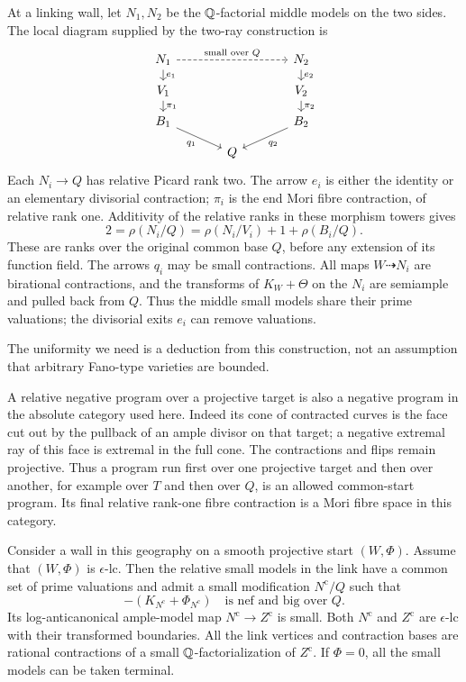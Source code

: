 At a linking wall, let $N_1,N_2$ be the $\mathbb Q$-factorial middle models
on the two sides. The local diagram supplied by the two-ray construction is
\[
\begin{tikzcd}[row sep=small,column sep=large]
 N_1 \arrow[rr,dashed,"\text{small over }Q"] \arrow[d,"e_1"]
   && N_2 \arrow[d,"e_2"] \\
 V_1 \arrow[d,"\pi_1"] && V_2 \arrow[d,"\pi_2"] \\
 B_1 \arrow[dr,"q_1"'] && B_2 \arrow[dl,"q_2"] \\
 & Q &
\end{tikzcd}
\]
Each $N_i\to Q$ has relative Picard rank two. The arrow $e_i$ is
either the identity or an elementary divisorial contraction;
$\pi_i$ is the end Mori fibre contraction, of relative rank one.
Additivity of the relative ranks in these morphism towers gives
\begin{equation}\label{bd:rank-tower}
 2=\rho(N_i/Q)=\rho(N_i/V_i)+1+\rho(B_i/Q).
\end{equation}
These are ranks over the original common base $Q$, before any
extension of its function field. The arrows $q_i$ may be small
contractions. All maps $W\dashrightarrow N_i$ are birational
contractions, and the transforms of $K_W+\Theta$ on the $N_i$ are
semiample and pulled back from $Q$. Thus the middle small models
share their prime valuations; the divisorial exits $e_i$ can remove
valuations.

The uniformity we need is a deduction from this construction,
not an assumption that arbitrary Fano-type varieties are bounded.

A relative negative program over a projective target is also a
negative program in the absolute category used here.  Indeed its
cone of contracted curves is the face cut out by the pullback of
an ample divisor on that target; a negative extremal ray of this
face is extremal in the full cone.  The contractions and flips
remain projective.  Thus a program run first over one projective
target and then over another, for example over $T$ and then over
$Q$, is an allowed common-start program.  Its final relative
rank-one fibre contraction is a Mori fibre space in this category.

\begin{lemma}
\label{bd:central}
Consider a wall in this geography on a smooth projective start
$(W,\Phi)$.  Assume that $(W,\Phi)$ is $\epsilon$-lc.  Then the
relative small models in the link have a common set of prime
valuations and admit a small modification $N^{\mathrm c}/Q$
such that
\[
  -(K_{N^{\mathrm c}}+\Phi_{N^{\mathrm c}})
       \quad\text{is nef and big over }Q.
\]
Its log-anticanonical ample-model map
$N^{\mathrm c}\to Z^{\mathrm c}$ is small.  Both
$N^{\mathrm c}$ and $Z^{\mathrm c}$ are $\epsilon$-lc with
their transformed boundaries.  All the link vertices and
contraction bases are rational contractions of a small
$\mathbb Q$-factorialization of $Z^{\mathrm c}$.  If $\Phi=0$, all
the small models can be taken terminal.
\end{lemma}

